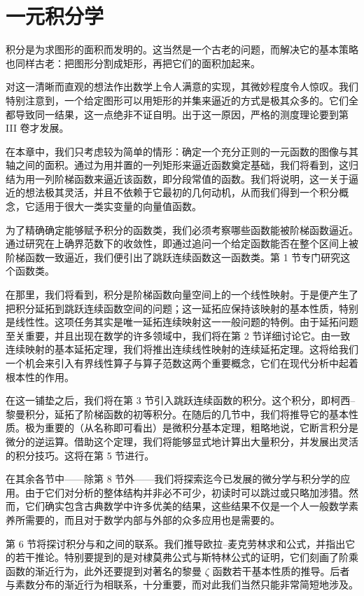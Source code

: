 \chapter{一元积分学}
积分是为求图形的面积而发明的。这当然是一个古老的问题，而解决它的基本策略也同样古老：把图形分割成矩形，再把它们的面积加起来。

对这一清晰而直观的想法作出数学上令人满意的实现，其微妙程度令人惊叹。我们特别注意到，一个给定图形可以用矩形的并集来逼近的方式是极其众多的。它们全都导致同一结果，这一点绝非不证自明。出于这一原因，严格的测度理论要到第 III 卷才发展。

在本章中，我们只考虑较为简单的情形：确定一个充分正则的一元函数的图像与其轴之间的面积。通过为用并置的一列矩形来逼近函数奠定基础，我们将看到，这归结为用一列阶梯函数来逼近该函数，即分段常值的函数。我们将说明，这一关于逼近的想法极其灵活，并且不依赖于它最初的几何动机，从而我们得到一个积分概念，它适用于很大一类实变量的向量值函数。

为了精确确定能够赋予积分的函数类，我们必须考察哪些函数能被阶梯函数逼近。通过研究在上确界范数下的收敛性，即通过追问一个给定函数能否在整个区间上被阶梯函数一致逼近，我们便引出了跳跃连续函数这一函数类。第 1 节专门研究这个函数类。

在那里，我们将看到，积分是阶梯函数向量空间上的一个线性映射。于是便产生了把积分延拓到跳跃连续函数空间的问题；这一延拓应保持该映射的基本性质，特别是线性性。这项任务其实是唯一延拓连续映射这一一般问题的特例。由于延拓问题至关重要，并且出现在数学的许多领域中，我们将在第 2 节详细讨论它。由一致连续映射的基本延拓定理，我们将推出连续线性映射的连续延拓定理。这将给我们一个机会来引入有界线性算子与算子范数这两个重要概念，它们在现代分析中起着根本性的作用。

在这一铺垫之后，我们将在第 3 节引入跳跃连续函数的积分。这个积分，即柯西–黎曼积分，延拓了阶梯函数的初等积分。在随后的几节中，我们将推导它的基本性质。极为重要的（从名称即可看出）是微积分基本定理，粗略地说，它断言积分是微分的逆运算。借助这个定理，我们将能够显式地计算出大量积分，并发展出灵活的积分技巧。这将在第 5 节进行。

在其余各节中——除第 8 节外——我们将探索迄今已发展的微分学与积分学的应用。由于它们对分析的整体结构并非必不可少，初读时可以跳过或只略加涉猎。然而，它们确实包含古典数学中许多优美的结果，这些结果不仅是一个人一般数学素养所需要的，而且对于数学内部与外部的众多应用也是需要的。

第 6 节将探讨积分与和之间的联系。我们推导欧拉–麦克劳林求和公式，并指出它的若干推论。特别要提到的是对棣莫弗公式与斯特林公式的证明，它们刻画了阶乘函数的渐近行为，此外还要提到对著名的黎曼 $ \zeta $ 函数若干基本性质的推导。后者与素数分布的渐近行为相联系，十分重要，而对此我们当然只能非常简短地涉及。

